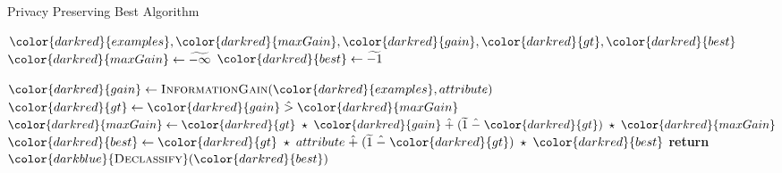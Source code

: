 \begin{algorithm}[H]
\caption{Privacy Preserving Best Algorithm}\label{a:id3-best-pp}
\begin{algorithmic}[1]
\Require ${\color{darkred}{examples}}, {\color{darkred}{maxGain}}, {\color{darkred}{gain}}, {\color{darkred}{gt}}, {\color{darkred}{best}}$
    \State ${\color{darkred}{maxGain}} \gets \enc{-\infty}$
    \State ${\color{darkred}{best}} \gets \enc{-1}$

        \State ${\color{darkred}{gain}} \gets  \textsc{InformationGain}({\color{darkred}{examples}}, attribute)$
        \State ${\color{darkred}{gt}} \gets {\color{darkred}{gain}} \hgt  {\color{darkred}{maxGain}}$
        \State ${\color{darkred}{maxGain}} \gets {\color{darkred}{gt}} \hmul {\color{darkred}{gain}} \hplus (\enc{1} \hminus {\color{darkred}{gt}}) \hmul {\color{darkred}{maxGain}}$ 
        \State ${\color{darkred}{best}} \gets {\color{darkred}{gt}} \hmul attribute \hplus (\enc{1} \hminus {\color{darkred}{gt}}) \hmul {\color{darkred}{best}}$
    \EndFor
    \State \textbf{return} ${\color{darkblue}{\textsc{Declassify}}}({\color{darkred}{best}})$
\EndProcedure
\end{algorithmic}
\end{algorithm}